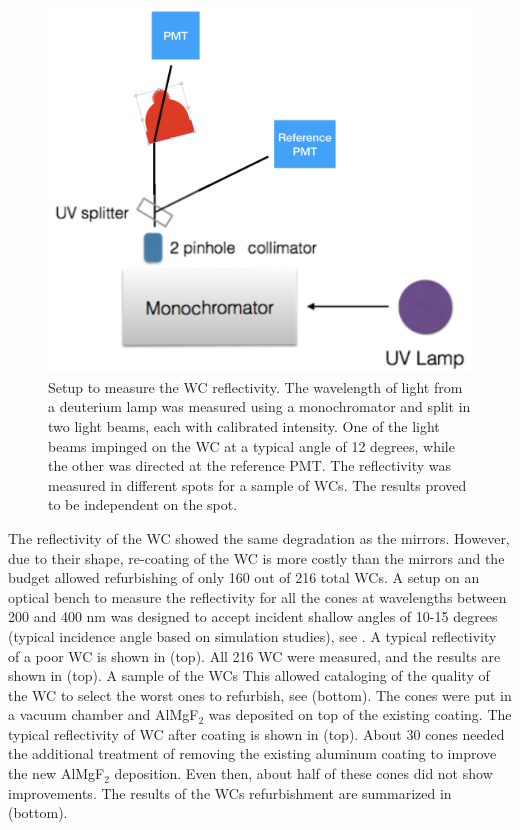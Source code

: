 \begin{figure}
	\centering
	\includegraphics[width=0.95\columnwidth,keepaspectratio]{img/wcSetup.png}
	\caption{Setup to measure the WC reflectivity. The wavelength of light from a deuterium lamp was measured using a monochromator and split in two
            light beams, each with calibrated intensity. One of the light beams impinged on the WC at a typical angle of 12 degrees,
            while the other was directed at the reference PMT. The reflectivity was measured in different spots for a sample of WCs.  The results proved
            to be independent on the spot. }
	\label{fig:wcSetup}
\end{figure}

The reflectivity of the WC showed the same degradation as the mirrors. However, due to their shape, re-coating of the WC is more costly than the mirrors and the budget allowed
refurbishing of only 160 out of 216 total WCs.
A setup on an optical bench to measure the reflectivity for all the cones at wavelengths between 200 and 400 nm was designed to accept incident
shallow angles of 10-15 degrees (typical incidence angle based on simulation studies), see . A typical reflectivity of a poor WC is shown in  (top).
All 216 WC were measured, and the results are shown in  (top). A sample of the WCs This allowed cataloging of the quality of the WC to select the worst ones to refurbish,
see  (bottom).
The cones were put in a vacuum chamber and AlMgF$_2$ was deposited on top of the existing coating. The typical reflectivity of WC after coating is shown in  (top).
About 30 cones needed the additional treatment of removing the existing aluminum coating to improve the new AlMgF$_2$ deposition. Even then, about half of these cones did not show improvements.
The results of the WCs refurbishment are summarized in  (bottom).


